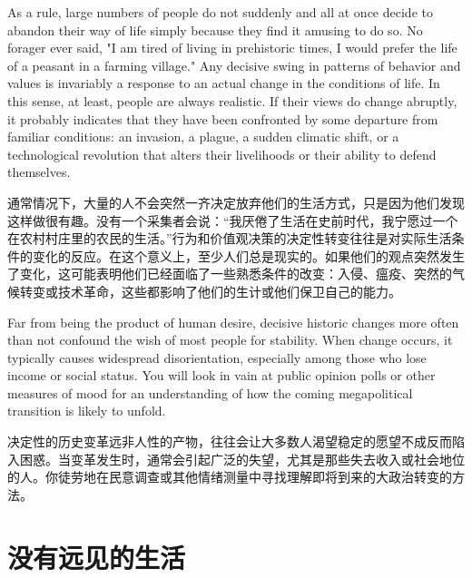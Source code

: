 \begin{Parallel}{97mm}{72mm}
  \ParallelLText
  {As a rule, large numbers of people do not suddenly and all at once decide to abandon their way of life simply because they find it amusing to do so. No forager ever said, "I am tired of living in prehistoric times, I would prefer the life of a peasant in a farming village." Any decisive swing in patterns of behavior and values is invariably a response to an actual change in the conditions of life. In this sense, at least, people are always realistic. If their views do change abruptly, it probably indicates that they have been confronted by some departure from familiar conditions: an invasion, a plague, a sudden climatic shift, or a technological revolution that alters their livelihoods or their ability to defend themselves.}
  
  \ParallelRText
  {通常情况下，大量的人不会突然一齐决定放弃他们的生活方式，只是因为他们发现这样做很有趣。没有一个采集者会说：“我厌倦了生活在史前时代，我宁愿过一个在农村村庄里的农民的生活。”行为和价值观决策的决定性转变往往是对实际生活条件的变化的反应。在这个意义上，至少人们总是现实的。如果他们的观点突然发生了变化，这可能表明他们已经面临了一些熟悉条件的改变：入侵、瘟疫、突然的气候转变或技术革命，这些都影响了他们的生计或他们保卫自己的能力。}
  \ParallelPar


  \ParallelLText
  {Far from being the product of human desire, decisive historic changes more often than not confound the wish of most people for stability. When change occurs, it typically causes widespread disorientation, especially among those who lose income or social status. You will look in vain at public opinion polls or other measures of mood for an understanding of how the coming megapolitical transition is likely to unfold.}
  
  \ParallelRText
  {决定性的历史变革远非人性的产物，往往会让大多数人渴望稳定的愿望不成反而陷入困惑。当变革发生时，通常会引起广泛的失望，尤其是那些失去收入或社会地位的人。你徒劳地在民意调查或其他情绪测量中寻找理解即将到来的大政治转变的方法。}
  \ParallelPar

  \section{没有远见的生活}


\end{Parallel}
